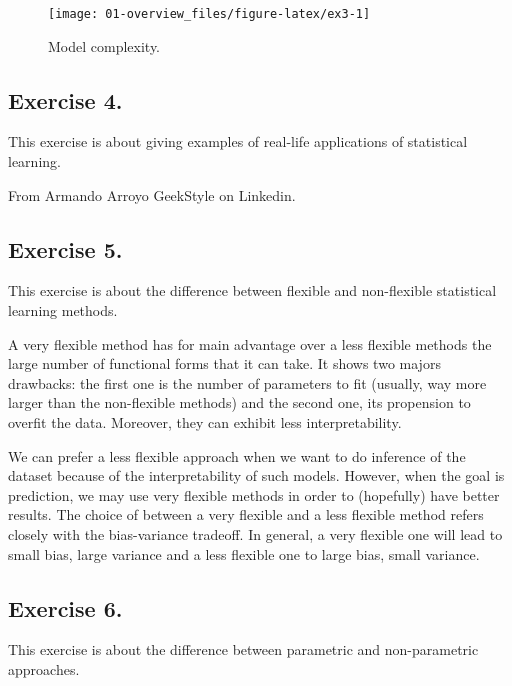 \documentclass[]{book}
\begin{document}
\begin{figure}

{\centering \texttt{[image: 01-overview\_files/figure-latex/ex3-1]} 

}

\caption{Model complexity.}\label{fig:ex3}
\end{figure}

\hypertarget{exercise-4.}{%
\subsection{Exercise 4.}\label{exercise-4.}}

This exercise is about giving examples of real-life applications of statistical learning.

\protect\hypertarget{fig:ml_appli}{}{}

From Armando Arroyo GeekStyle on Linkedin.

\hypertarget{exercise-5.}{%
\subsection{Exercise 5.}\label{exercise-5.}}

This exercise is about the difference between flexible and non-flexible statistical learning methods.

A very flexible method has for main advantage over a less flexible methods the large number of functional forms that it can take. It shows two majors drawbacks: the first one is the number of parameters to fit (usually, way more larger than the non-flexible methods) and the second one, its propension to overfit the data. Moreover, they can exhibit less interpretability.

We can prefer a less flexible approach when we want to do inference of the dataset because of the interpretability of such models. However, when the goal is prediction, we may use very flexible methods in order to (hopefully) have better results. The choice of between a very flexible and a less flexible method refers closely with the bias-variance tradeoff. In general, a very flexible one will lead to small bias, large variance and a less flexible one to large bias, small variance.

\hypertarget{exercise-6.}{%
\subsection{Exercise 6.}\label{exercise-6.}}

This exercise is about the difference between parametric and non-parametric approaches.
\end{document}

